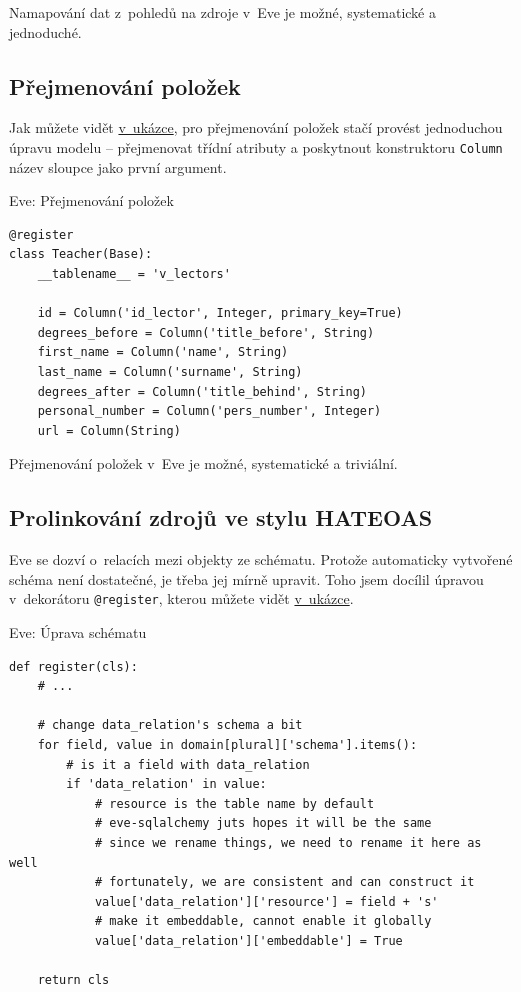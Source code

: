 Namapování dat z~pohledů na zdroje v~Eve je možné, systematické a jednoduché.

\subsection{Přejmenování položek}\label{pux159ejmenovuxe1nuxed-poloux17eek}

Jak můžete vidět \protect\hyperlink{code:eve:rename}{v~ukázce}, pro přejmenování položek stačí provést jednoduchou úpravu modelu -- přejmenovat třídní atributy a poskytnout konstruktoru \verb!Column! název sloupce jako první argument.

\begin{listing}[htbp]
\caption{{\label{code:eve:rename}Eve: Přejmenování položek}}
\begin{verbatim}
@register
class Teacher(Base):
    __tablename__ = 'v_lectors'

    id = Column('id_lector', Integer, primary_key=True)
    degrees_before = Column('title_before', String)
    first_name = Column('name', String)
    last_name = Column('surname', String)
    degrees_after = Column('title_behind', String)
    personal_number = Column('pers_number', Integer)
    url = Column(String)
\end{verbatim}
\end{listing}

Přejmenování položek v~Eve je možné, systematické a triviální.

\subsection{Prolinkování zdrojů ve stylu HATEOAS}\label{prolinkovuxe1nuxed-zdrojux16f-ve-stylu-hateoas}

Eve se dozví o~relacích mezi objekty ze schématu. Protože automaticky vytvořené schéma není dostatečné, je třeba jej mírně upravit. Toho jsem docílil úpravou v~dekorátoru \verb!@register!, kterou můžete vidět \protect\hyperlink{code:eve:links1}{v~ukázce}.

\begin{listing}[htbp]
\caption{{\label{code:eve:links1}Eve: Úprava schématu}}
\begin{verbatim}
def register(cls):
    # ...

    # change data_relation's schema a bit
    for field, value in domain[plural]['schema'].items():
        # is it a field with data_relation
        if 'data_relation' in value:
            # resource is the table name by default
            # eve-sqlalchemy juts hopes it will be the same
            # since we rename things, we need to rename it here as well
            # fortunately, we are consistent and can construct it
            value['data_relation']['resource'] = field + 's'
            # make it embeddable, cannot enable it globally
            value['data_relation']['embeddable'] = True

    return cls
\end{verbatim}
\end{listing}

